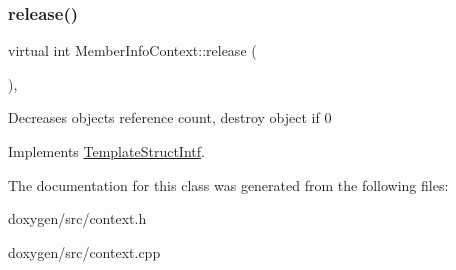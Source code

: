 \mbox{\label{class_member_info_context_a079b37ec712b039f5cb3eaf93e2a8f24}} 
\subsubsection{\texorpdfstring{release()}{release()}}
{\footnotesize\ttfamily virtual int Member\+Info\+Context\+::release (\begin{DoxyParamCaption}{ }\end{DoxyParamCaption})\hspace{0.3cm}{\ttfamily [inline]}, {\ttfamily [virtual]}}

Decreases object\textquotesingle{}s reference count, destroy object if 0 

Implements \mbox{\hyperlink{class_template_struct_intf_a3dce7dd29d3f66a8080b40578e8a5045}{Template\+Struct\+Intf}}.



The documentation for this class was generated from the following files\+:\begin{DoxyCompactItemize}
\item 
doxygen/src/context.\+h\item 
doxygen/src/context.\+cpp\end{DoxyCompactItemize}

